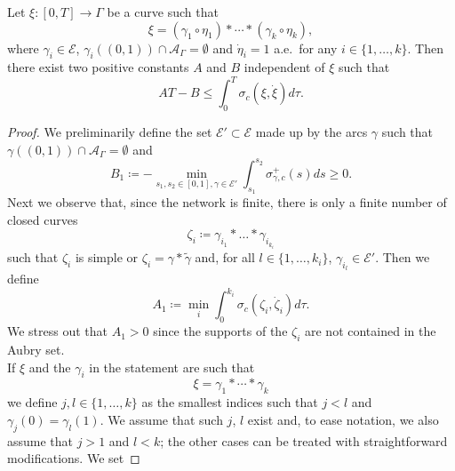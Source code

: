 \documentclass[11pt,a4paper,american]{article}
\newcommand{\Acal}{\mathcal A}
\newcommand{\Ecal}{\mathcal E}
\begin{document}
    \begin{lem}\label{sigestaux}
        Let $\xi:[0,T]\to\Gamma$ be a curve such that
        \begin{equation}\label{eq:sigestaux.1}
            \xi=(\gamma_1\circ\eta_1)*\dotsb*(\gamma_k\circ\eta_k),
        \end{equation}
        where $\gamma_i\in\Ecal$, $\gamma_i((0,1))\cap\Acal_\Gamma=\emptyset$ and $\dot\eta_i=1$ a.e.\ for any $i\in\{1,\dotsc,k\}$. Then there exist two positive constants $A$ and $B$ independent of $\xi$ such that
        \begin{equation}\label{eq:sigestaux.2}
            AT-B\le\int_0^T\sigma_c\left(\xi,\dot\xi\right)d\tau.
        \end{equation}
    \end{lem}
    \begin{proof}
        We preliminarily define the set $\Ecal'\subset\Ecal$ made up by the arcs $\gamma$ such that $\gamma((0,1))\cap\Acal_\Gamma=\emptyset$ and
        \begin{equation}\label{eq:sigestaux1}
            B_1\coloneqq-\min_{s_1,s_2\in[0,1],\gamma\in\Ecal'}\int_{s_1}^{s_2}\sigma_{\gamma,c}^+(s)ds\ge0.
        \end{equation}
        Next we observe that, since the network is finite, there is only a finite number of closed curves
        \begin{equation}\label{eq:sigestaux2}
            \zeta_i\coloneqq\gamma_{i_1}*\dotsc*\gamma_{i_{k_i}}
        \end{equation}
        such that $\zeta_i$ is simple or $\zeta_i=\gamma*\widetilde\gamma$ and, for all $l\in\{1,\dotsc,k_i\}$, $\gamma_{i_l}\in\Ecal'$. Then we define
        \begin{equation}\label{eq:sigestaux3}
            A_1\coloneqq\min_i\int_0^{k_i}\sigma_c\left(\zeta_i,\dot\zeta_i\right)d\tau.
        \end{equation}
        We stress out that $A_1>0$ since the supports of the $\zeta_i$ are not contained in the Aubry set.\\
        If $\xi$ and the $\gamma_i$ in the statement are such that
        \begin{equation}\label{eq:sigestaux4}
            \xi=\gamma_1*\dotsb*\gamma_k
        \end{equation}
        we define $j,l\in\{1,\dotsc,k\}$ as the smallest indices such that $j<l$ and $\gamma_j(0)=\gamma_l(1)$. We assume that such $j$, $l$ exist and, to ease notation, we also assume that $j>1$ and $l<k$; the other cases can be treated with straightforward modifications. We set

\end{proof}
\end{document}
